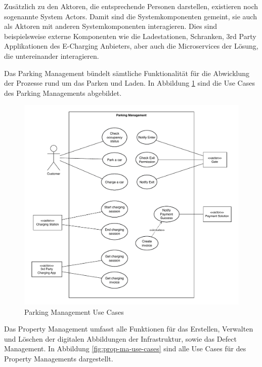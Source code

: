 Zusätzlich zu den Aktoren, die entsprechende Personen darstellen, existieren noch sogenannte System Actors. Damit sind die Systemkomponenten gemeint, sie auch als Aktoren mit anderen Systemkomponenten interagieren. Dies sind beispielsweise externe Komponenten wie die Ladestationen, Schranken, 3rd Party Applikationen des E-Charging Anbieters, aber auch die Microservices der Lösung, die untereinander interagieren.

Das Parking Management bündelt sämtliche Funktionalität für die Abwicklung der Prozesse rund um das Parken und Laden. In Abbildung \ref{fig:park-ma-use-cases} sind die Use Cases des Parking Managements abgebildet.

\begin{figure}[H]
    \centering
    \includegraphics[width=\textwidth]{resources/park-ma-use-cases.pdf}
    \caption{Parking Management Use Cases}
    \label{fig:park-ma-use-cases}
\end{figure}

Das Property Management umfasst alle Funktionen für das Erstellen, Verwalten und Löschen der digitalen Abbildungen der Infrastruktur, sowie das Defect Management.
In Abbildung \ref{fig:prop-ma-use-cases} sind alle Use Cases für des Property Managements dargestellt.

